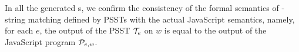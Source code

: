 In all the generated {\regexp}s, we confirm the consistency of the formal semantics of  \regexp-string matching defined by PSSTs with the actual JavaScript semantics, namely, for each {\regexp}  $e$, the output of the PSST $\mathcal{T}_e$ on $w$ is equal to the output of the JavaScript program $\mathcal{P}_{e,w}$.
